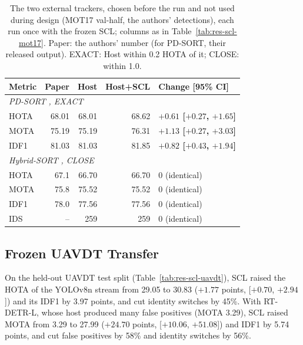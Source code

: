 \begin{table}[tbp]
\centering
\caption{The two external trackers, chosen before the run and not used during design (MOT17 val-half, the authors' detections), each run once with the frozen SCL; columns as in Table~\ref{tab:res-scl-mot17}. Paper: the authors' number (for PD-SORT, their released output). EXACT: Host within 0.2 HOTA of it; CLOSE: within 1.0.}
\label{tab:res-scl-external}
\begin{tabular}{lrrrl}
\toprule
Metric & Paper & Host & Host+SCL & Change [95\% CI]\\
\midrule
\multicolumn{5}{l}{\textit{PD-SORT} \cite{wang2025pdsort}\textit{, EXACT}}\\
\quad HOTA & 68.01 & 68.01 & 68.62 & \textbf{$+0.61$ [$+0.27$, $+1.65$]}\\
\quad MOTA & 75.19 & 75.19 & 76.31 & \textbf{$+1.13$ [$+0.27$, $+3.03$]}\\
\quad IDF1 & 81.03 & 81.03 & 81.85 & \textbf{$+0.82$ [$+0.43$, $+1.94$]}\\
\multicolumn{5}{l}{\textit{Hybrid-SORT} \cite{yang2024hybridsort}\textit{, CLOSE}}\\
\quad HOTA & 67.1 & 66.70 & 66.70 & 0 (identical)\\
\quad MOTA & 75.8 & 75.52 & 75.52 & 0 (identical)\\
\quad IDF1 & 78.0 & 77.56 & 77.56 & 0 (identical)\\
\quad IDS & -- & 259 & 259 & 0 (identical)\\
\bottomrule
\end{tabular}
\end{table}

\subsection{Frozen UAVDT Transfer}\label{sec:res-scl-uavdt}
On the held-out UAVDT test split (Table~\ref{tab:res-scl-uavdt}), SCL raised the HOTA of the YOLOv8n stream from 29.05 to 30.83 ($+1.77$ points, [$+0.70$, $+2.94$]) and its IDF1 by 3.97 points, and cut identity switches by 45\%. With RT-DETR-L, whose host produced many false positives (MOTA 3.29), SCL raised MOTA from 3.29 to 27.99 ($+24.70$ points, [$+10.06$, $+51.08$]) and IDF1 by 5.74 points, and cut false positives by 58\% and identity switches by 56\%.

